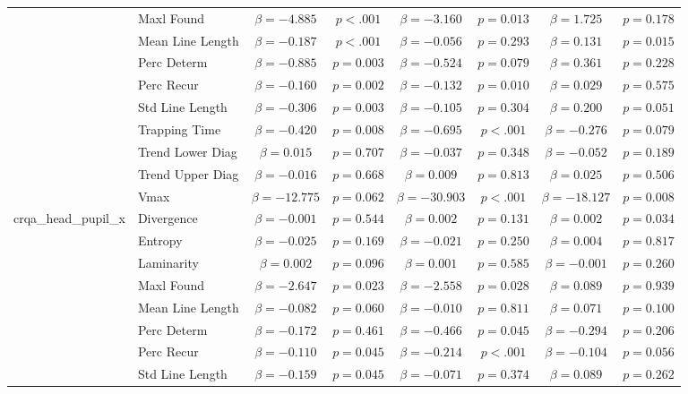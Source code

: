 \begin{tabular}{llcc|cc|cc}
 & Maxl Found & $\beta = -4.885$ & $p < .001$ & $\beta = -3.160$ & $p = 0.013$ & $\beta = 1.725$ & $p = 0.178$ \\
 & Mean Line Length & $\beta = -0.187$ & $p < .001$ & $\beta = -0.056$ & $p = 0.293$ & $\beta = 0.131$ & $p = 0.015$ \\
 & Perc Determ & $\beta = -0.885$ & $p = 0.003$ & $\beta = -0.524$ & $p = 0.079$ & $\beta = 0.361$ & $p = 0.228$ \\
 & Perc Recur & $\beta = -0.160$ & $p = 0.002$ & $\beta = -0.132$ & $p = 0.010$ & $\beta = 0.029$ & $p = 0.575$ \\
 & Std Line Length & $\beta = -0.306$ & $p = 0.003$ & $\beta = -0.105$ & $p = 0.304$ & $\beta = 0.200$ & $p = 0.051$ \\
 & Trapping Time & $\beta = -0.420$ & $p = 0.008$ & $\beta = -0.695$ & $p < .001$ & $\beta = -0.276$ & $p = 0.079$ \\
 & Trend Lower Diag & $\beta = 0.015$ & $p = 0.707$ & $\beta = -0.037$ & $p = 0.348$ & $\beta = -0.052$ & $p = 0.189$ \\
 & Trend Upper Diag & $\beta = -0.016$ & $p = 0.668$ & $\beta = 0.009$ & $p = 0.813$ & $\beta = 0.025$ & $p = 0.506$ \\
 & Vmax & $\beta = -12.775$ & $p = 0.062$ & $\beta = -30.903$ & $p < .001$ & $\beta = -18.127$ & $p = 0.008$ \\
\midrule
\multirow{12}{*}{crqa_head_pupil_x} & Divergence & $\beta = -0.001$ & $p = 0.544$ & $\beta = 0.002$ & $p = 0.131$ & $\beta = 0.002$ & $p = 0.034$ \\
 & Entropy & $\beta = -0.025$ & $p = 0.169$ & $\beta = -0.021$ & $p = 0.250$ & $\beta = 0.004$ & $p = 0.817$ \\
 & Laminarity & $\beta = 0.002$ & $p = 0.096$ & $\beta = 0.001$ & $p = 0.585$ & $\beta = -0.001$ & $p = 0.260$ \\
 & Maxl Found & $\beta = -2.647$ & $p = 0.023$ & $\beta = -2.558$ & $p = 0.028$ & $\beta = 0.089$ & $p = 0.939$ \\
 & Mean Line Length & $\beta = -0.082$ & $p = 0.060$ & $\beta = -0.010$ & $p = 0.811$ & $\beta = 0.071$ & $p = 0.100$ \\
 & Perc Determ & $\beta = -0.172$ & $p = 0.461$ & $\beta = -0.466$ & $p = 0.045$ & $\beta = -0.294$ & $p = 0.206$ \\
 & Perc Recur & $\beta = -0.110$ & $p = 0.045$ & $\beta = -0.214$ & $p < .001$ & $\beta = -0.104$ & $p = 0.056$ \\
 & Std Line Length & $\beta = -0.159$ & $p = 0.045$ & $\beta = -0.071$ & $p = 0.374$ & $\beta = 0.089$ & $p = 0.262$ \\

\end{tabular}
